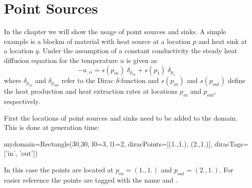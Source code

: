 
%
%
%

\section{Point Sources}
\label{POINT SOURCES}
In the chapter we will show the usage of point sources and sinks. 
A simple example is a blockm of material with heat source at a location
$p$ and heat sink at a location $q$. Under the assumption of a constant
conductivity the steady heat diffusion equation for the temperature $u$
is given as 
\begin{equation}
        -u_{,ii} = s(p_{in}) \; \delta_{p_{in}} + s(p_1) \; \delta_{p_1}
        \label{EX:DIRAC1}
\end{equation}
where $\delta_{p_{in}}$ and $\delta_{p_{out}}$ refer to the Dirac $\delta$-function and
$s({p_{in}})$ and $s({p_{out}})$ define the heat production and heat extraction rates at 
locations ${p_{in}}$ and ${p_{out}}$, respectively.

First the locations of  point sources and sinks need to be added to the 
domain. This is done at generation time:  
\begin{python}
mydomain=Rectangle(30,30, l0=3, l1=2, 
                diracPoints=[(1.,1.), (2.,1.)],  diracTags=['in', 'out'])
\end{python}
In this case the points are located at $p_{in}=(1.,1.)$ and $p_{out}=(2.,1.)$.
For easier reference the points are tagged with the name  and . 

